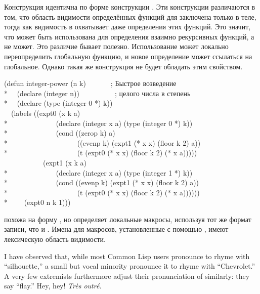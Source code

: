 \begin{defmac}
Конструкция  идентична по форме конструкции .
Эти конструкции различаются в том, что область видимости определённых функций
для  заключена только в теле, тогда как видимость в 
охватывает даже определения этих функций. Это значит, что  может
быть использована для определения взаимно рекурсивных функций, а  не
может. Это различие бывает полезно. Использование  может локально
переопределить глобальную функцию, и новое определение может ссылаться на
глобальное. Однако такая же конструкция  не будет обладать этим
свойством.
\begin{lisp}
(defun integer-power (n k)~~~~~~~; Быстрое возведение \\*
~~(declare (integer n))~~~~~~~~~~; целого числа в степень \\*
~~(declare (type (integer 0 *) k)) \\
~~(labels ((expt0 (x k a) \\*
~~~~~~~~~~~~~(declare (integer x a) (type (integer 0 *) k)) \\*
~~~~~~~~~~~~~(cond ((zerop k) a) \\*
~~~~~~~~~~~~~~~~~~~((evenp k) (expt1 (* x x) (floor k 2) a)) \\*
~~~~~~~~~~~~~~~~~~~(t (expt0 (* x x) (floor k 2) (* x a))))) \\
~~~~~~~~~~~(expt1 (x k a) \\*
~~~~~~~~~~~~~(declare (integer x a) (type (integer 1 *) k)) \\*
~~~~~~~~~~~~~(cond ((evenp k) (expt1 (* x x) (floor k 2) a)) \\*
~~~~~~~~~~~~~~~~~~~(t (expt0 (* x x) (floor k 2) (* x a)))))) \\*
~~~~(expt0 n k 1)))
\end{lisp}

 похожа на форму , но определяет локальные макросы,
используя тот же формат записи, что и .
Имена для макросов, установленные с помощью , имеют лексическую
область видимости.

\begin{new}
I have observed that, while most Common Lisp users pronounce 
to rhyme with ``silhouette,'' a small but vocal minority pronounce it
to rhyme with ``Chevrolet.''  A very few extremists furthermore
adjust their pronunciation
of  similarly: they say ``flay.''
Hey, hey!  \emph{Tr\`es outr\'e.}
\end{new}


\end{defmac}
